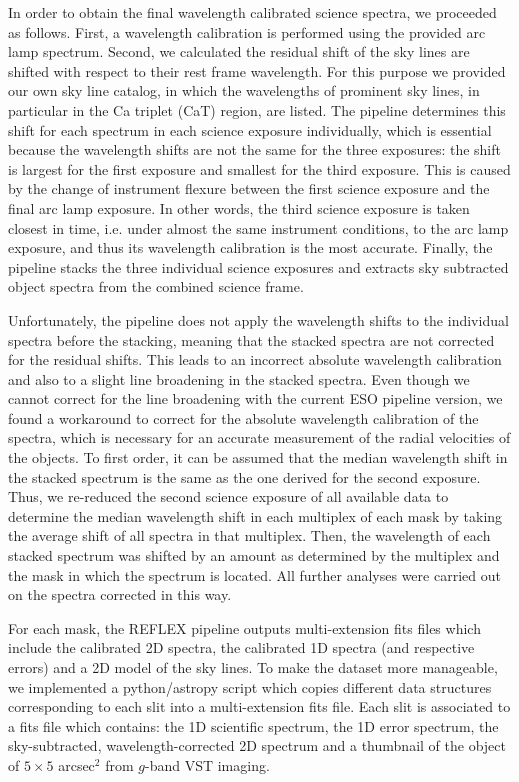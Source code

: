 \documentclass[useAMS,usenatbib]{mn2e}
\begin{document}
In order to obtain the final wavelength calibrated science spectra, we 
proceeded as follows. First, a wavelength calibration 
is performed using the provided arc lamp spectrum. Second, we calculated
the residual shift of the sky lines are shifted with respect to their rest frame 
wavelength. For this purpose we provided our own sky line catalog, in which 
the wavelengths of prominent sky lines, in particular in the Ca triplet (CaT)
region, are listed. The pipeline determines this shift for each spectrum in 
each science exposure individually, which is essential because the wavelength 
shifts are not the same for the three exposures: the shift is largest for the 
first exposure and smallest for the third exposure. This 
is caused by the 
change of instrument flexure between the first science exposure and the final 
arc lamp exposure. In other words, the third science exposure is taken 
closest in time, i.e. under almost the same instrument conditions, to the arc 
lamp exposure, and thus its wavelength calibration is the most accurate. 
Finally, the pipeline stacks the three individual science exposures and 
extracts sky subtracted object spectra from the combined science frame.

Unfortunately, the pipeline does not apply the wavelength 
shifts to the individual spectra before the stacking, meaning that the stacked
spectra are not corrected for the residual shifts. This leads to an incorrect
absolute wavelength calibration and also to a slight line broadening in the 
stacked spectra. Even though we cannot correct for the line broadening with
the current ESO pipeline version, we found a workaround to correct for the
absolute wavelength calibration of the spectra, which is necessary for an 
accurate measurement of the radial velocities of the objects. To first order, 
it can be assumed that the median wavelength shift in the stacked spectrum is 
the same as the one derived for the second exposure. Thus, we re-reduced the 
second science exposure of all available data to determine the median 
wavelength shift in each multiplex of each mask by taking the average shift 
of all spectra in that multiplex. Then, the wavelength of each stacked 
spectrum was shifted by an amount as determined by the multiplex and the mask
in which the spectrum is located. All further analyses were carried out 
on the spectra corrected in this way.

For each mask, the REFLEX pipeline outputs multi-extension fits files which 
include the calibrated 2D spectra, the calibrated 1D spectra (and respective 
errors) and a 2D model of the sky lines. To make the dataset more manageable, 
we implemented a python/astropy script which copies different data structures 
corresponding to each slit into a multi-extension fits file. Each slit is 
associated to a fits file which contains: the 1D scientific spectrum, the 1D 
error spectrum, the sky-subtracted, wavelength-corrected 2D spectrum and a 
thumbnail of the object of $5\times5$ arcsec$^2$ from $g$-band VST imaging. 
\end{document}
